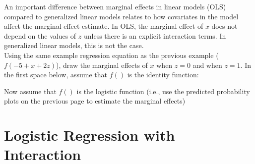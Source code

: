 \documentclass[a4paper,12pt]{article}
\begin{document}
\noindent An important difference between marginal effects in linear models (OLS) compared to generalized linear models relates to how covariates in the model affect the marginal effect estimate. In OLS, the marginal effect of $x$ does not depend on the values of $z$ unless there is an explicit interaction terms. In generalized linear models, this is not the case.\\

\noindent Using the same example regression equation as the previous example ($f(-5 + x + 2z)$), draw the marginal effects of $x$ when $z = 0$ and when $z = 1$. In the first space below, assume that $f()$ is the identity function:

\begin{center}
\end{center}

 
\noindent Now assume that $f()$ is the logistic function (i.e., use the predicted probability plots on the previous page to estimate the marginal effects)
 
 
\begin{center}
\end{center}



\clearpage
\section{Logistic Regression with Interaction}
\end{document}

